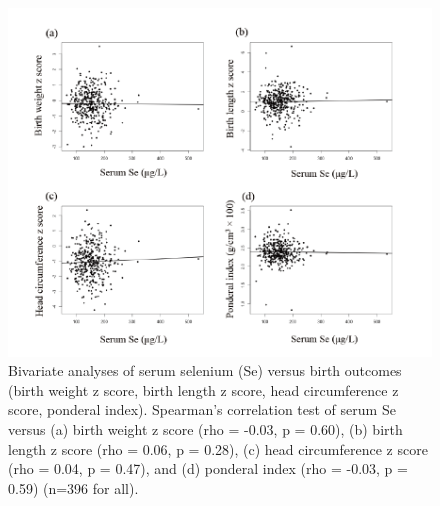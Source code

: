 \begin{figure}
  \centering
    \label{fig:Fig334}
  \includegraphics[scale=1]{Figures/Fig334.pdf}
  \caption[Bivariate analyses of serum selenium versus birth outcomes (birth weight z score, birth length z score, head circumference z score, ponderal index)]{Bivariate analyses of serum selenium (Se) versus birth outcomes (birth weight z score, birth length z score, head circumference z score, ponderal index). Spearman's correlation test of serum Se versus (a) birth weight z score (rho = -0.03, p = 0.60), (b) birth length z score (rho = 0.06, p = 0.28), (c) head circumference z score (rho = 0.04, p = 0.47), and (d) ponderal index (rho = -0.03, p = 0.59) (n=396 for all).}
\end{figure}

